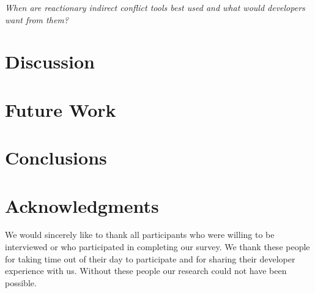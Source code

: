 \documentclass[conference]{IEEEtran}
\begin{document}
\begin{description}[topsep=6pt]
	\item[RQ7] \textit{When are reactionary indirect conflict tools best used and what would developers want from them?}
\end{description}



\section{Discussion}

\section{Future Work}

\section{Conclusions}

\section{Acknowledgments}

We would sincerely like to thank all participants who were willing to be interviewed or who participated
in completing our survey. We thank these people for taking time out of their day to participate and for
sharing their developer experience with us. Without these people our research could not have been possible.

%
%

\end{document}
